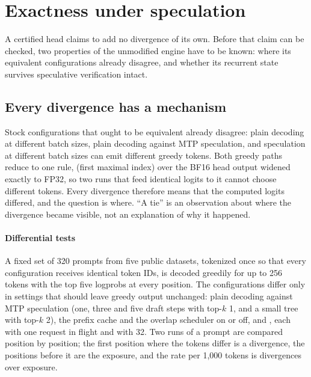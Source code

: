 \section{Exactness under speculation}\label{sec:speculation}
A certified head claims to add no divergence of its own. Before that claim can be checked, two properties of the unmodified engine have to be known: where its equivalent configurations already disagree, and whether its recurrent state survives speculative verification intact.

\subsection{Every divergence has a mechanism}\label{sec:divergence}
Stock configurations that ought to be equivalent already disagree: plain decoding at different batch sizes, plain decoding against MTP speculation, and speculation at different batch sizes can emit different greedy tokens. Both greedy paths reduce to one rule,  (first maximal index) over the BF16 head output widened exactly to FP32, so two runs that feed identical logits to it cannot choose different tokens. Every divergence therefore means that the computed logits differed, and the question is where. ``A tie'' is an observation about where the divergence became visible, not an explanation of why it happened.

\paragraph{Differential tests} A fixed set of 320 prompts from five public datasets, tokenized once so that every configuration receives identical token IDs, is decoded greedily for up to 256 tokens with the top five logprobs at every position. The configurations differ only in settings that should leave greedy output unchanged: plain decoding against MTP speculation (one, three and five draft steps with top-$k$ 1, and a small tree with top-$k$ 2), the prefix cache and the overlap scheduler on or off,  and , each with one request in flight and with 32. Two runs of a prompt are compared position by position; the first position where the tokens differ is a divergence, the positions before it are the exposure, and the rate per 1,000 tokens is divergences over exposure.

